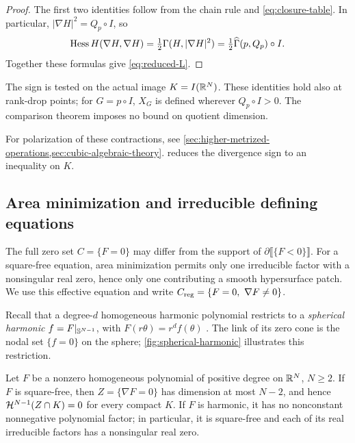 \begin{proof}
The first two identities follow from the chain rule and
\eqref{eq:closure-table}.  In particular, \(|\nabla H|^2=Q_p\circ I\), so
\[
 \operatorname{Hess} H(\nabla H,\nabla H)
 =\tfrac12\Gamma(H,|\nabla H|^2)
 =\tfrac12\widehat\Gamma(p,Q_p)\circ I.
\]
Together these formulas give \eqref{eq:reduced-L}.
\end{proof}


The sign is tested on the actual image \(K=I(\mathbb R^N)\). These identities
hold also at rank-drop points; for \(G=p\circ I\), \(X_G\) is defined
wherever \(Q_p\circ I>0\). The comparison theorem imposes no bound
on quotient dimension.

For polarization of these contractions, see
\cref{sec:higher-metrized-operations,sec:cubic-algebraic-theory}.
 reduces the divergence sign to an inequality
on \(K\).

\subsection{Area minimization and irreducible defining equations}
\label{sec:irreducible-equations}

The full zero set \(C=\{F=0\}\) may differ from the support of
\(\partial\llbracket\{F<0\}\rrbracket\). For a square-free equation,
area minimization permits only one irreducible factor with a nonsingular
real zero, hence only one contributing a smooth hypersurface patch.
We use this effective equation and write
\(C_{\mathrm{reg}}=\{F=0,\ \nabla F\ne0\}\).

Recall that a degree-\(d\) homogeneous harmonic polynomial restricts
to a \emph{spherical harmonic} \(f=F|_{\mathbb S^{N-1}}\), with
\(F(r\theta)=r^df(\theta)\)
\cite[Chapter~5]{AxlerBourdonRamey01}.
The link of its zero cone is the nodal set \(\{f=0\}\) on the sphere;
\cref{fig:spherical-harmonic} illustrates this restriction.

\begin{lemma}
\label{lem:square-free-critical-set}
Let \(F\) be a nonzero homogeneous polynomial of positive degree on
\(\mathbb R^N\), \(N\ge2\). If \(F\) is square-free, then
\(Z=\{\nabla F=0\}\) has dimension at most \(N-2\), and hence
\(\mathcal H^{N-1}(Z\cap K)=0\) for every compact \(K\).
If \(F\) is harmonic, it has no nonconstant nonnegative polynomial
factor; in particular, it is square-free and each of its real
irreducible factors has a nonsingular real zero.
\end{lemma}

